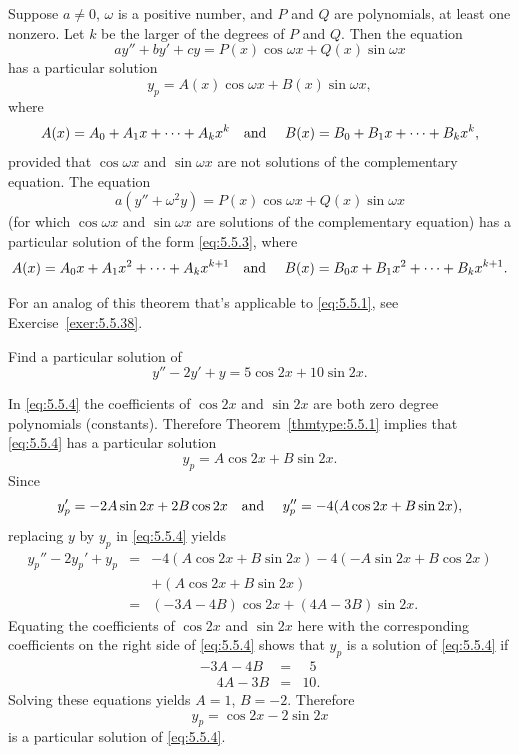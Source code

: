 \begin{theorem}
  \color{blue}
  \label{thmtype:5.5.1} Suppose $a\ne0$, $\omega$ is a positive number, and $P$ and $Q$ are polynomials, at least one nonzero. Let
  $k$ be the larger of the degrees of $P$ and $Q$. Then the equation
  \[
    ay''+by'+cy=P(x)\cos\omega x+Q(x)\sin\omega x
  \]
  has a particular solution
  \begin{equation}
    \label{eq:5.5.3}y_{p}=A(x)\cos\omega x+B(x)\sin\omega x,
  \end{equation}
  where
  \[
    A(x)=A_{0}+A_{1}x+\cdots+A_{k}x^{k}\mbox{\quad and \quad}B(x)=B_{0}+B_{1}x+\cdots+B_{k}x^{k},
  \]
  provided that $\cos\omega x$ and $\sin\omega x$ are not solutions of the complementary equation.
  The equation
  \[
    a(y''+\omega^{2}y)=P(x)\cos\omega x+Q(x)\sin\omega x
  \]
  (for which $\cos\omega x$ and $\sin\omega x$ are solutions of the complementary equation) has a particular solution
  of the form \eqref{eq:5.5.3}, where
  \[
    A(x)=A_{0}x+A_{1}x^{2}+\cdots+A_{k}x^{k+1}\mbox{\quad and \quad}B(x)=B_{0}x+B_{1}x^{2}+\cdots+B_{k}x^{k+1}.
  \]
\end{theorem}

For an analog of this theorem that's applicable to \eqref{eq:5.5.1}, see Exercise~\ref{exer:5.5.38}.

\begin{example}
  \label{example:5.5.1} \rm Find a particular solution of
  \begin{equation}
    \label{eq:5.5.4}y''-2y'+y=5\cos2x+10\sin2x.
  \end{equation}
\end{example}

\begin{examplesolution}
\solution In \eqref{eq:5.5.4} the coefficients of $\cos2x$ and $\sin2x$ are both zero degree
polynomials (constants). Therefore Theorem~\ref{thmtype:5.5.1} implies that \eqref{eq:5.5.4} has a
particular solution
\[
  y_{p}=A\cos2x+B\sin2x.
\]
Since
\[
  y_{p}'=-2A\sin2x+2B\cos2x\mbox{\quad and \quad}y_{p}''=-4(A\cos2x+B\sin2x),
\]
replacing $y$ by $y_{p}$ in \eqref{eq:5.5.4} yields
\begin{eqnarray*}
  y_{p}''-2y_{p}'+y_{p} & = & -4(A\cos2x+B\sin2x)-4(-A\sin2x+B\cos2x) \\
                        &   & +(A\cos2x+B\sin2x)                      \\
                        & = & (-3A-4B)\cos2x+(4A-3B)\sin2x.
\end{eqnarray*}
Equating the coefficients of $\cos2x$ and $\sin2x$ here with the corresponding coefficients on the
right side of \eqref{eq:5.5.4} shows that $y_{p}$ is a solution of \eqref{eq:5.5.4} if
\begin{eqnarray*}
  -3A-4B           & = & \phantom{1}5\phantom{.} \\
  \phantom{-}4A-3B & = & 10.
\end{eqnarray*}
Solving these equations yields $A=1$, $B=-2$. Therefore
\[
  y_{p}=\cos2x-2\sin2x
\]
is a particular solution of \eqref{eq:5.5.4}.
\end{examplesolution}

